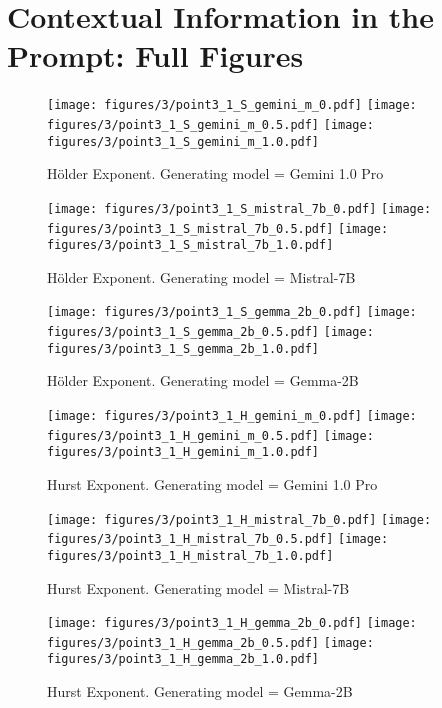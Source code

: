\newpage
\section{Contextual Information in the Prompt: Full Figures}\label{sect:app:info_density_full_figures}
\begin{figure}[H]
    \centering
    \texttt{[image: figures/3/point3\_1\_S\_gemini\_m\_0.pdf]}
    \texttt{[image: figures/3/point3\_1\_S\_gemini\_m\_0.5.pdf]}
    \texttt{[image: figures/3/point3\_1\_S\_gemini\_m\_1.0.pdf]}
    \caption{H\"older Exponent. Generating model = Gemini 1.0 Pro}
    \label{fig:append_c_s_gemini_m}
\end{figure}

\begin{figure}[H]
    \centering
    \texttt{[image: figures/3/point3\_1\_S\_mistral\_7b\_0.pdf]}
    \texttt{[image: figures/3/point3\_1\_S\_mistral\_7b\_0.5.pdf]}
    \texttt{[image: figures/3/point3\_1\_S\_mistral\_7b\_1.0.pdf]}
    \caption{H\"older Exponent. Generating model = Mistral-7B}
    \label{fig:append_c_s_mistral}
\end{figure}
\begin{figure}[H]
    \centering
    \texttt{[image: figures/3/point3\_1\_S\_gemma\_2b\_0.pdf]}
    \texttt{[image: figures/3/point3\_1\_S\_gemma\_2b\_0.5.pdf]}
    \texttt{[image: figures/3/point3\_1\_S\_gemma\_2b\_1.0.pdf]}
    \caption{H\"older Exponent. Generating model = Gemma-2B}
    \label{fig:append_c_s_gemma}
\end{figure}

\begin{figure}[H]
    \centering
    \texttt{[image: figures/3/point3\_1\_H\_gemini\_m\_0.pdf]}
    \texttt{[image: figures/3/point3\_1\_H\_gemini\_m\_0.5.pdf]}
    \texttt{[image: figures/3/point3\_1\_H\_gemini\_m\_1.0.pdf]}
    \caption{Hurst Exponent. Generating model = Gemini 1.0 Pro}
    \label{fig:append_c_h_gemini_m}
\end{figure}

\begin{figure}[H]
    \centering
    \texttt{[image: figures/3/point3\_1\_H\_mistral\_7b\_0.pdf]}
    \texttt{[image: figures/3/point3\_1\_H\_mistral\_7b\_0.5.pdf]}
    \texttt{[image: figures/3/point3\_1\_H\_mistral\_7b\_1.0.pdf]}
    \caption{Hurst Exponent. Generating model = Mistral-7B}
    \label{fig:append_c_h_mistral}
\end{figure}
\begin{figure}[H]
    \centering
    \texttt{[image: figures/3/point3\_1\_H\_gemma\_2b\_0.pdf]}
    \texttt{[image: figures/3/point3\_1\_H\_gemma\_2b\_0.5.pdf]}
    \texttt{[image: figures/3/point3\_1\_H\_gemma\_2b\_1.0.pdf]}
    \caption{Hurst Exponent. Generating model = Gemma-2B}
    \label{fig:append_c_h_gemma}
\end{figure}

